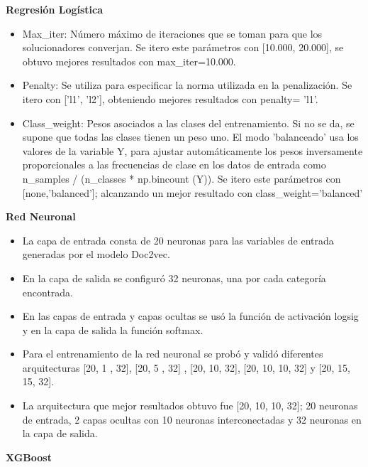 \textbf{Regresión Logística}
\begin{itemize}
	\item Max\_iter: Número máximo de iteraciones que se toman para que los solucionadores converjan. Se itero este parámetros con [10.000, 20.000], se obtuvo mejores resultados con  max\_iter=10.000.
	\item Penalty: Se utiliza para especificar la norma utilizada en la penalización. Se itero con ['l1', 'l2'], obteniendo mejores resultados con penalty= 'l1'.
	\item Class\_weight: Pesos asociados a las clases del entrenamiento. Si no se da, se supone que todas las clases tienen un peso uno. El modo 'balanceado' usa los valores de la variable Y, para ajustar automáticamente los pesos inversamente proporcionales a las frecuencias de clase en los datos de entrada como n\_samples / (n\_classes * np.bincount (Y)). Se itero este parámetros con [none,'balanced']; alcanzando un mejor resultado con  class\_weight='balanced'
\end{itemize}

\textbf{Red Neuronal}



\begin{itemize}
	\item La capa de entrada consta de 20 neuronas para las variables de entrada generadas por el modelo Doc2vec.
	\item En la capa de salida se configuró 32 neuronas, una  por cada categoría encontrada.
	\item En las capas de entrada y capas ocultas se usó la función de activación logsig y en la capa de salida la función softmax.
	\item Para el entrenamiento de la red neuronal se probó y validó diferentes arquitecturas  [20, 1 , 32], [20, 5 , 32] , [20, 10, 32], [20, 10, 10, 32] y [20, 15, 15, 32].
	\item La arquitectura que mejor resultados obtuvo fue [20, 10, 10, 32]; 20 neuronas de entrada, 2 capas ocultas con 10 neuronas interconectadas y 32 neuronas en la capa de salida. 

\end{itemize}

\textbf{XGBoost}

